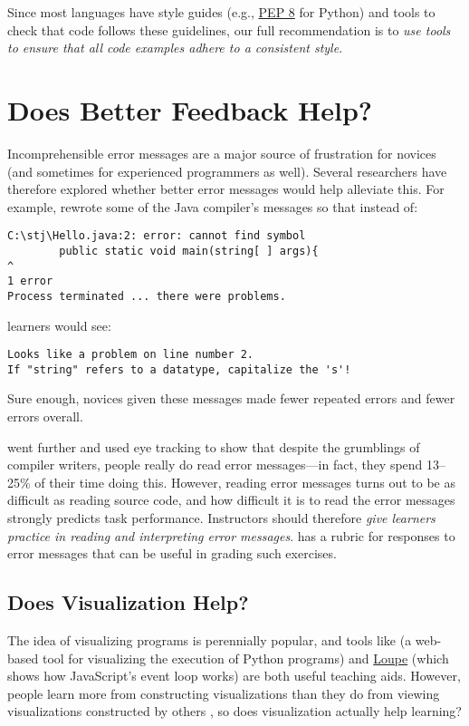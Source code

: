 Since most languages have style guides (e.g.,
\href{https://www.python.org/dev/peps/pep-0008/}{PEP 8} for Python)
and tools to check that code follows these guidelines, our full
recommendation is to \emph{use tools to ensure that all code
  examples adhere to a consistent style}.

\section{Does Better Feedback Help?}\label{s:pck-error}

Incomprehensible error messages are a major source of frustration for
novices (and sometimes for experienced programmers as well).  Several
researchers have therefore explored whether better error messages
would help alleviate this.  For example, \cite{Beck2016} rewrote some
of the Java compiler's messages so that instead of:

\begin{verbatim}
C:\stj\Hello.java:2: error: cannot find symbol
        public static void main(string[ ] args){
^
1 error
Process terminated ... there were problems.
\end{verbatim}

\noindent
learners would see:

\begin{verbatim}
Looks like a problem on line number 2.
If "string" refers to a datatype, capitalize the 's'!
\end{verbatim}

\noindent
Sure enough, novices given these messages made fewer repeated errors
and fewer errors overall.

\cite{Bari2017} went further and used eye tracking to show that
despite the grumblings of compiler writers, people really do read
error messages---in fact, they spend 13--25\% of their time doing
this.  However, reading error messages turns out to be as difficult as
reading source code, and how difficult it is to read the error
messages strongly predicts task performance.  Instructors should
therefore \emph{give learners practice in reading and interpreting
  error messages}.  \cite{Marc2011} has a rubric for responses to
error messages that can be useful in grading such exercises.

\subsection*{Does Visualization Help?}

The idea of visualizing programs is perennially popular, and tools
like \cite{Guo2013} (a web-based tool for visualizing the execution of
Python programs) and \href{http://latentflip.com/loupe/}{Loupe} (which
shows how JavaScript's event loop works) are both useful teaching
aids.  However, people learn more from constructing visualizations
than they do from viewing visualizations constructed by others
\cite{Stas1998,Ceti2016}, so does visualization actually help
learning?

